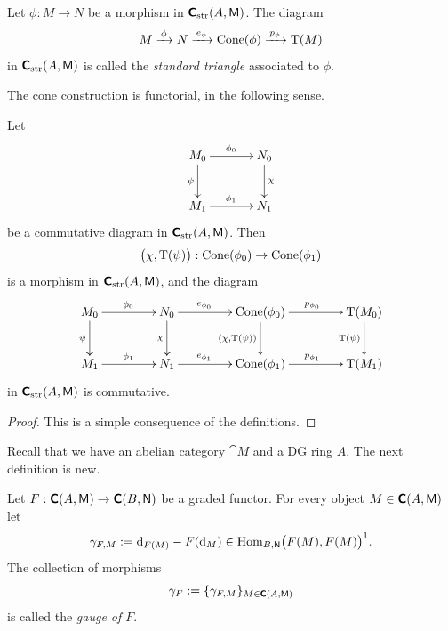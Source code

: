 \begin{dfn} \label{dfn:1140}
Let $\phi : M \to N$ be a morphism in $\boldsymbol{\mathsf{C}}_{\mathrm{str}}(A, \operatorname{\mathsf{M}})$.
The diagram 
\[ M \xrightarrow{ \, \phi \, } N \xrightarrow{ \, e_{\phi} \, } \operatorname{Cone}(\phi) 
\xrightarrow{ \, p_{\phi} \, } \operatorname{T}(M) \]
in $\boldsymbol{\mathsf{C}}_{\mathrm{str}}(A, \operatorname{\mathsf{M}})$ is called the {\em standard triangle} 
associated to $\phi$. 
\end{dfn}

The cone construction is functorial, in the following sense. 

\begin{prop}\label{prop:1162}
Let 
\[ \UseTips  \xymatrix @C=8ex @R=6ex {
M_0 
\ar[r]^{\phi_0}
\ar[d]_{\psi}
& 
N_0 
\ar[d]^{\chi}
\\
M_1
\ar[r]^{\phi_1}
& 
N_1 
} \]
be a commutative diagram in $\boldsymbol{\mathsf{C}}_{\mathrm{str}}(A, \operatorname{\mathsf{M}})$. 
Then 
\begin{equation} \label{eqn:1113}
\bigl( \chi, \operatorname{T}(\psi) \bigr) : \operatorname{Cone}(\phi_0) \to \operatorname{Cone}(\phi_1)
\end{equation}
is a morphism in $\boldsymbol{\mathsf{C}}_{\mathrm{str}}(A, \operatorname{\mathsf{M}})$, and the diagram 
\[ \UseTips  \xymatrix @C=10ex @R=6ex {
M_0 
\ar[r]^{\phi_0}
\ar[d]_{\psi}
& 
N_0 
\ar[r]^(0.4){e_{\phi_0}}
\ar[d]_{\chi}
& 
\opn{Cone}(\phi_0)
\ar[r]^{p_{\phi_0}}
\ar[d]_{(\chi, \opn{T}(\psi))}
& 
\opn{T}(M_0)
\ar[d]_{\opn{T}(\psi)}
\\
M_1
\ar[r]^{\phi_1}
& 
N_1
\ar[r]^(0.4){e_{\phi_1}}
& 
\opn{Cone}(\phi_1)
\ar[r]^{p_{\phi_1}}
& 
\opn{T}(M_1)
} \]
in $\boldsymbol{\mathsf{C}}_{\mathrm{str}}(A, \operatorname{\mathsf{M}})$ is commutative. 
\end{prop}

\begin{proof}
This is a simple consequence of the definitions. 
\end{proof}



 \label{subsec:gauge}

Recall that we have an abelian category $\cat{M}$ and a DG ring $A$.
The next definition is new. 

\begin{dfn} \label{dfn:1214}
Let 
$F : \boldsymbol{\mathsf{C}}(A, \operatorname{\mathsf{M}}) \to \boldsymbol{\mathsf{C}}(B, \operatorname{\mathsf{N}})$
be a graded functor. For every object 
$M \in \boldsymbol{\mathsf{C}}(A, \operatorname{\mathsf{M}})$ let 
\[ \gamma_{F, M} := \mathrm{d}_{F(M)} - F(\mathrm{d}_M)  \in 
\operatorname{Hom}_{B, \operatorname{\mathsf{N}}} \bigl( F(M), F(M) \bigr)^1 . \]
The collection of morphisms 
\[ \gamma_F := \{ \gamma_{F, M} \}_{M \in \boldsymbol{\mathsf{C}}(A, \operatorname{\mathsf{M}})}  \]
is called the {\em gauge of $F$}.
\end{dfn}

